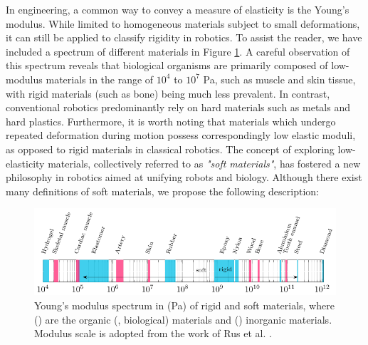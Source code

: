 In engineering, a common way to convey a measure of elasticity is the Young's modulus. While limited to homogeneous materials subject to small deformations, it can still be applied to classify rigidity in robotics. To assist the reader, we have included a spectrum of different materials in Figure \ref{fig:1:1}. A careful observation of this spectrum reveals that biological organisms are primarily composed of low-modulus materials in the range of $10^4$ to $10^7$ \si{Pa}, such as muscle and skin tissue, with rigid materials (such as bone) being much less prevalent. In contrast, conventional robotics predominantly rely on hard materials such as metals and hard plastics. Furthermore, it is worth noting that materials which undergo repeated deformation during motion possess correspondingly low elastic moduli, as opposed to rigid materials in classical robotics. The concept of exploring low-elasticity materials, collectively referred to as \emph{"soft materials"}, has fostered a new philosophy in robotics aimed at unifying robots and biology. Although there exist many definitions of soft materials, we propose the following description:
%
\begin{figure}[!t]
    \centering
    \includegraphics*[width=\textwidth]{./pdf/thesis-figure-1-0.pdf}
    \caption{\small Young's modulus spectrum in (\si{Pa}) of rigid and soft materials, where () are the organic (\ie, biological) materials and () inorganic materials. Modulus scale is adopted from the work of Rus et al. \cite{Rus2015}.\label{fig:1:1}}
    \vspace{-4mm}
\end{figure}
%
\
